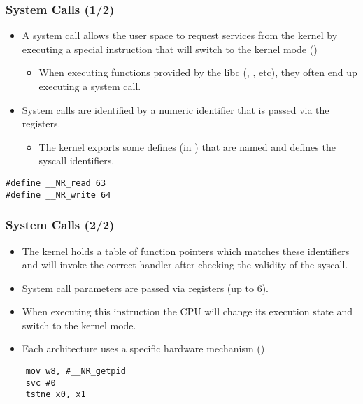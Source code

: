 \begin{frame}[fragile]
  \frametitle{System Calls (1/2)}
  \begin{itemize}
    \item A system call allows the user space to request services from the
          kernel by executing a special instruction that will switch to the
          kernel mode ()
    \begin{itemize}
      \item When executing functions provided by the libc (,
            , etc), they often end up executing a system call.
    \end{itemize}
    \item System calls are identified by a numeric identifier that is passed
          via the registers.
    \begin{itemize}
      \item The kernel exports some defines (in ) that are named
             and defines the syscall identifiers.
    \end{itemize}
  \end{itemize}
  \begin{block}{}
    \begin{verbatim}
#define __NR_read 63
#define __NR_write 64
    \end{verbatim}
  \end{block}
\end{frame}

\begin{frame}[fragile]
  \frametitle{System Calls (2/2)}
  \begin{itemize}
    \item The kernel holds a table of function pointers which matches these
          identifiers and will invoke the correct handler after checking the
          validity of the syscall.
    \item System call parameters are passed via registers (up to 6).
    \item When executing this instruction the CPU will change its execution
    state and switch to the kernel mode.
    \item Each architecture uses a specific hardware mechanism
    ()
  \end{itemize}
  \begin{block}{}
    \begin{verbatim}
    mov w8, #__NR_getpid
    svc #0
    tstne x0, x1
    \end{verbatim}
  \end{block}
\end{frame}


